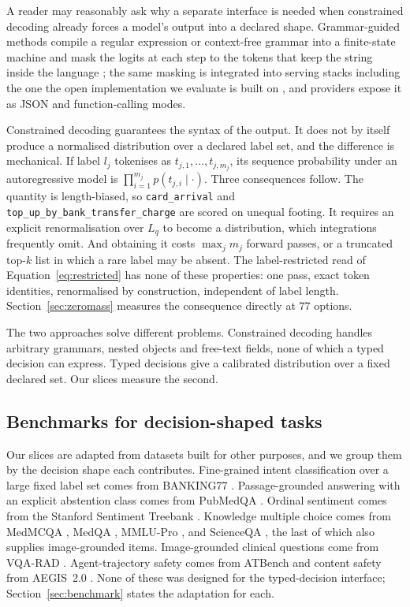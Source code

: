 A reader may reasonably ask why a separate interface is needed when constrained
decoding already forces a model's output into a declared shape. Grammar-guided
methods compile a regular expression or context-free grammar into a finite-state
machine and mask the logits at each step to the tokens that keep the string inside
the language \citep{willard2023outlines}; the same masking is integrated into
serving stacks including the one the open implementation we evaluate is built on
\citep{kwon2023vllm}, and providers expose it as JSON and function-calling modes.

Constrained decoding guarantees the syntax of the output. It does not by itself
produce a normalised distribution over a declared label set, and the difference is
mechanical. If label $l_j$ tokenises as $t_{j,1},\dots,t_{j,m_j}$, its sequence
probability under an autoregressive model is $\prod_{i=1}^{m_j} p(t_{j,i} \mid
\cdot)$. Three consequences follow. The quantity is length-biased, so
\texttt{card\_arrival} and \texttt{top\_up\_by\_bank\_transfer\_charge} are scored
on unequal footing. It requires an explicit renormalisation over $L_q$ to become a
distribution, which integrations frequently omit. And obtaining it costs
$\max_j m_j$ forward passes, or a truncated top-$k$ list in which a rare label may
be absent. The label-restricted read of Equation~\eqref{eq:restricted} has none of
these properties: one pass, exact token identities, renormalised by construction,
independent of label length. Section~\ref{sec:zeromass} measures the consequence
directly at 77 options.

The two approaches solve different problems. Constrained decoding handles
arbitrary grammars, nested objects and free-text fields, none of which a typed
decision can express. Typed decisions give a calibrated distribution over a fixed
declared set. Our slices measure the second.

\subsection{Benchmarks for decision-shaped tasks}

Our slices are adapted from datasets built for other purposes, and we group them
by the decision shape each contributes. Fine-grained intent classification over a
large fixed label set comes from BANKING77 \citep{casanueva2020banking77}.
Passage-grounded answering with an explicit abstention class comes from PubMedQA
\citep{jin2019pubmedqa}. Ordinal sentiment comes from the Stanford Sentiment
Treebank \citep{socher2013sst}. Knowledge multiple choice comes from MedMCQA
\citep{pal2022medmcqa}, MedQA \citep{jin2020disease}, MMLU-Pro
\citep{wang2024mmlupro}, and ScienceQA \citep{lu2022scienceqa}, the last of which
also supplies image-grounded items. Image-grounded clinical questions come from
VQA-RAD \citep{lau2018vqarad}. Agent-trajectory safety comes from ATBench
\citep{li2026atbench} and content safety from AEGIS~2.0
\citep{ghosh2025aegis2}. None of these was designed for the typed-decision
interface; Section~\ref{sec:benchmark} states the adaptation for each.

